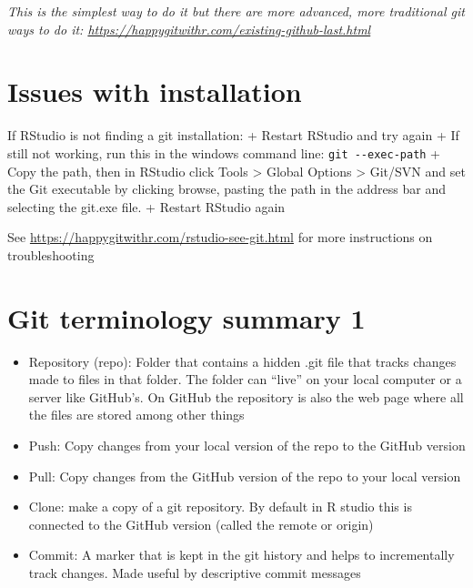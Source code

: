 \documentclass[
  letterpaper,
  DIV=11,
  numbers=noendperiod]{scrreprt}
\providecommand{\tightlist}{%
  \setlength{\itemsep}{0pt}\setlength{\parskip}{0pt}}\usepackage{longtable,booktabs,array}
\begin{document}
\emph{This is the simplest way to do it but there are more advanced,
more traditional git ways to do it:
\url{https://happygitwithr.com/existing-github-last.html}}

\hypertarget{issues-with-installation}{%
\section{Issues with installation}\label{issues-with-installation}}

If RStudio is not finding a git installation: + Restart RStudio and try
again + If still not working, run this in the windows command line:
\texttt{git\ -\/-exec-path} + Copy the path, then in RStudio click Tools
\textgreater{} Global Options \textgreater{} Git/SVN and set the Git
executable by clicking browse, pasting the path in the address bar and
selecting the git.exe file. + Restart RStudio again

See \url{https://happygitwithr.com/rstudio-see-git.html} for more
instructions on troubleshooting

\hypertarget{git-terminology-summary-1}{%
\section{Git terminology summary 1}\label{git-terminology-summary-1}}

\begin{itemize}
\tightlist
\item
  Repository (repo): Folder that contains a hidden .git file that tracks
  changes made to files in that folder. The folder can ``live'' on your
  local computer or a server like GitHub's. On GitHub the repository is
  also the web page where all the files are stored among other things
\item
  Push: Copy changes from your local version of the repo to the GitHub
  version
\item
  Pull: Copy changes from the GitHub version of the repo to your local
  version
\item
  Clone: make a copy of a git repository. By default in R studio this is
  connected to the GitHub version (called the remote or origin)
\item
  Commit: A marker that is kept in the git history and helps to
  incrementally track changes. Made useful by descriptive commit
  messages
\end{itemize}

\end{document}
